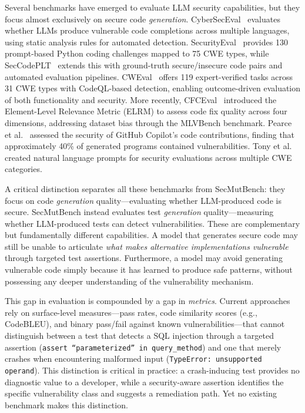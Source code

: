 \documentclass[sigconf,anonymous,review]{acmart}
\begin{document}
Several benchmarks have emerged to evaluate LLM security capabilities, but they focus almost exclusively on secure code \emph{generation}. CyberSecEval~\cite{bhatt2023cyberseceval} evaluates whether LLMs produce vulnerable code completions across multiple languages, using static analysis rules for automated detection. SecurityEval~\cite{siddiq2022securityeval} provides 130 prompt-based Python coding challenges mapped to 75 CWE types, while SecCodePLT~\cite{secccodeplt2024} extends this with ground-truth secure/insecure code pairs and automated evaluation pipelines. CWEval~\cite{yang2024cweval} offers 119 expert-verified tasks across 31 CWE types with CodeQL-based detection, enabling outcome-driven evaluation of both functionality and security. More recently, CFCEval~\cite{cheng2025cfceval} introduced the Element-Level Relevance Metric (ELRM) to assess code fix quality across four dimensions, addressing dataset bias through the MLVBench benchmark. Pearce et al.~\cite{pearce2022asleep} assessed the security of GitHub Copilot's code contributions, finding that approximately 40\% of generated programs contained vulnerabilities. Tony et al.~\cite{tony2023llmseceval} created natural language prompts for security evaluations across multiple CWE categories.

A critical distinction separates all these benchmarks from SecMutBench: they focus on code \emph{generation} quality---evaluating whether LLM-produced code is secure. SecMutBench instead evaluates test \emph{generation} quality---measuring whether LLM-produced tests can detect vulnerabilities. These are complementary but fundamentally different capabilities. A model that generates secure code may still be unable to articulate \emph{what makes alternative implementations vulnerable} through targeted test assertions. Furthermore, a model may avoid generating vulnerable code simply because it has learned to produce safe patterns, without possessing any deeper understanding of the vulnerability mechanism.

This gap in evaluation is compounded by a gap in \emph{metrics}. Current approaches rely on surface-level measures---pass rates, code similarity scores (e.g., CodeBLEU), and binary pass/fail against known vulnerabilities---that cannot distinguish between a test that detects a SQL injection through a targeted assertion (\texttt{assert ``parameterized'' in query\_method}) and one that merely crashes when encountering malformed input (\texttt{TypeError: unsupported operand}). This distinction is critical in practice: a crash-inducing test provides no diagnostic value to a developer, while a security-aware assertion identifies the specific vulnerability class and suggests a remediation path. Yet no existing benchmark makes this distinction.
\end{document}
